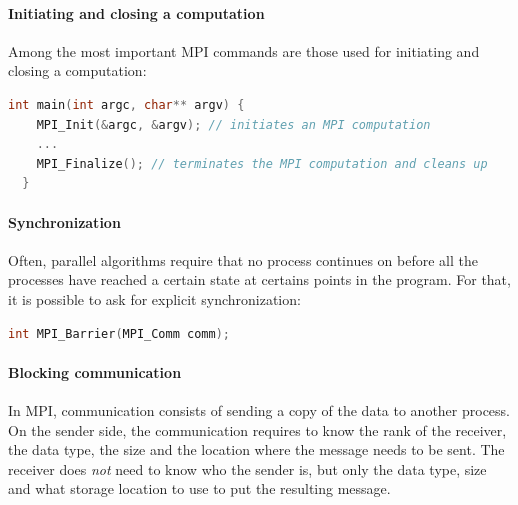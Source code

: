 \documentclass{article}
\begin{document}
\paragraph{Initiating and closing a computation}
Among the most important MPI commands are those used for initiating and closing a computation:
\begin{lstlisting}[language=C]
  int main(int argc, char** argv) {
    MPI_Init(&argc, &argv); // initiates an MPI computation
    ...
    MPI_Finalize(); // terminates the MPI computation and cleans up
  }
\end{lstlisting}

\paragraph{Synchronization}
Often, parallel algorithms require that no process continues on before all the processes have reached a certain state at certains points in the program. For that, it is possible to ask for explicit synchronization:
\begin{lstlisting}[language=C]
  int MPI_Barrier(MPI_Comm comm);
\end{lstlisting}

\paragraph{Blocking communication}
In MPI, communication consists of sending a copy of the data to another process. On the sender side, the communication requires to know the rank of the receiver, the data type, the size and the location where the message needs to be sent. The receiver does \textit{not} need to know who the sender is, but only the data type, size and what storage location to use to put the resulting message.
\end{document}
